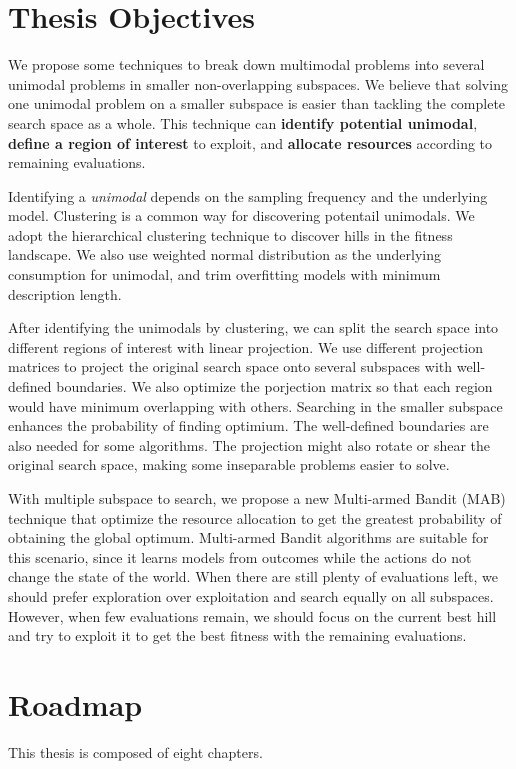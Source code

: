 \section{Thesis Objectives}
We propose some techniques to break down multimodal problems into several unimodal problems in smaller non-overlapping subspaces.
We believe that solving one unimodal problem on a smaller subspace is easier than tackling the complete search space as a whole.
This technique can \textbf{identify potential unimodal},
\textbf{define a region of interest} to exploit, 
and \textbf{allocate resources} according to remaining evaluations.

Identifying a \textit{unimodal} depends on the sampling frequency and the underlying model.
Clustering is a common way for discovering potentail unimodals.
We adopt the hierarchical clustering technique to discover hills in the fitness landscape.
We also use weighted normal distribution as the underlying consumption for unimodal, and trim overfitting models with minimum description length.

After identifying the unimodals by clustering, we can split the search space into different regions of interest with linear projection.
We use different projection matrices to project the original search space onto several subspaces with well-defined boundaries.
We also optimize the porjection matrix so that each region would have minimum overlapping with others.
Searching in the smaller subspace enhances the probability of finding optimium.
The well-defined boundaries are also needed for some algorithms.
The projection might also rotate or shear the original search space, making some inseparable problems easier to solve.

With multiple subspace to search, we propose a new Multi-armed Bandit (MAB) technique 
that optimize the resource allocation to get the greatest probability of obtaining the global optimum.
Multi-armed Bandit algorithms are suitable for this scenario, 
since it learns models from outcomes while the actions do not change the state of the world.
When there are still plenty of evaluations left, we should prefer exploration over exploitation and search equally on all subspaces.
However, when few evaluations remain, we should focus on the current best hill 
and try to exploit it to get the best fitness with the remaining evaluations.  


\section{Roadmap}
This thesis is composed of eight chapters.

